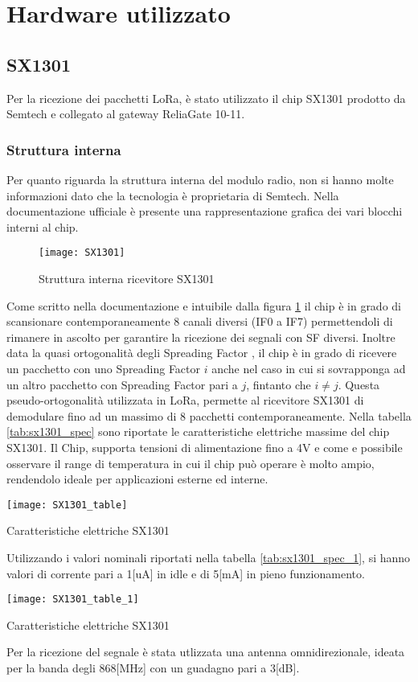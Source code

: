 \section{Hardware utilizzato}

\subsection{SX1301}
Per la ricezione dei pacchetti LoRa, è stato utilizzato il chip SX1301 prodotto
da Semtech e collegato al gateway ReliaGate 10-11.
\subsubsection{Struttura interna}
Per quanto riguarda la struttura interna del modulo radio, non si hanno molte
informazioni dato che la tecnologia è proprietaria di Semtech. Nella
documentazione ufficiale è presente una rappresentazione grafica dei vari
blocchi interni al chip.

\begin{figure}[th]
        \centering 
                \texttt{[image: SX1301]}
        \caption{Struttura interna ricevitore SX1301}
        \label{fig:sx1301}
\end{figure}

Come scritto nella documentazione   e intuibile dalla
figura \ref{fig:sx1301} il chip è in grado di scansionare contemporaneamente 
8 canali diversi (IF0 a IF7)  permettendoli di rimanere in ascolto per garantire
la ricezione dei segnali con SF diversi.
Inoltre data la quasi ortogonalità degli Spreading Factor
, il chip è in grado di ricevere un pacchetto
con uno Spreading Factor $i$ anche nel caso in cui si sovrapponga ad un altro
pacchetto con Spreading Factor pari a $j$, fintanto che $i\neq j$. Questa
pseudo-ortogonalità utilizzata in LoRa, permette al ricevitore  SX1301 
di demodulare fino ad un massimo di 8 pacchetti contemporaneamente.
Nella tabella \ref{tab:sx1301_spec} sono riportate le caratteristiche elettriche
massime del  chip SX1301. Il Chip, supporta tensioni di
alimentazione fino a 4V e  come e possibile osservare il range di temperatura in cui il
chip può operare è molto ampio, rendendolo ideale per applicazioni esterne ed
interne. 

\begin{table}[th]
        \centering 
                \texttt{[image: SX1301\_table]}
        \caption{Caratteristiche elettriche SX1301}
\label{tab:sx1301_spec}
\end{table}
Utilizzando i valori nominali riportati nella tabella \ref{tab:sx1301_spec_1},
si hanno valori di corrente pari a 1[uA] in idle  e di 5[mA] in pieno
funzionamento.
\begin{table}[th]
        \centering 
                \texttt{[image: SX1301\_table\_1]}
        \caption{Caratteristiche elettriche SX1301}
        \label{tab:sx1301_spec_1}
\end{table}
Per la ricezione del segnale è stata utlizzata una antenna omnidirezionale,
ideata per la banda degli 868[MHz] con un guadagno pari a 3[dB].
